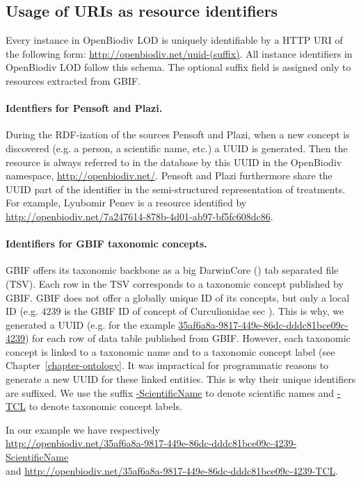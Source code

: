 \subsection{Usage of URIs as resource identifiers}

Every instance in OpenBiodiv LOD is uniquely identifiable by a HTTP URI of the following form: \url{http://openbiodiv.net/uuid-(suffix)}. All instance identifiers in OpenBiodiv LOD follow this schema. The optional suffix field is assigned only to resources extracted from GBIF.

\paragraph{Identfiers for Pensoft and Plazi.} During the RDF-ization of the sources Pensoft and Plazi, when a new concept is discovered (e.g. a person, a scientific name, etc.) a UUID is generated. Then the resource is always referred to in the database by this UUID in the OpenBiodiv namespace, \url{http://openbiodiv.net/}. Pensoft and Plazi furthermore share the UUID part of the identifier in the semi-structured representation of treatments. For example, Lyubomir Penev is a resource identified by \url{http://openbiodiv.net/7a247614-878b-4d01-ab97-bf5fc608dc86}.

\paragraph{Identifiers for GBIF taxonomic concepts.} GBIF offers its taxonomic backbone as a big DarwinCore (\cite{wieczorek_darwin_2012}) tab separated file (TSV). Each row in the TSV corresponds to a taxonomic concept published by GBIF. GBIF does not offer a globally unique ID of its concepts, but only a local ID (e.g. $4239$ is the GBIF ID of concept of Curculionidae sec \cite{gbif_secretariat_gbif_2017}). This is why, we generated a UUID (e.g. for the example \url{35af6a8a-9817-449e-86dc-dddc81bce09c-4239}) for each row of data table published from GBIF. However, each taxonomic concept is linked to a taxonomic name and to a taxonomic concept label (see Chapter~\ref{chapter-ontology}. It was impractical for programmatic reasons to generate a new UUID for these linked entities. This is why their unique identifiers are suffixed. We use the suffix \url{-ScientificName} to denote scientific names and \url{-TCL} to denote taxonomic concept labels.

In our example we have respectively\\\url{http://openbiodiv.net/35af6a8a-9817-449e-86dc-dddc81bce09c-4239-ScientificName}\\and \url{http://openbiodiv.net/35af6a8a-9817-449e-86dc-dddc81bce09c-4239-TCL}.

